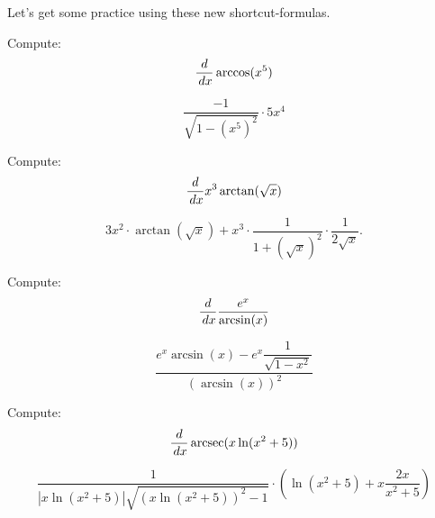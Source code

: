 \documentclass{ximera}
\begin{document}
Let's get some practice using these new shortcut-formulas.
\begin{example}
	Compute:
	\[ \frac{d}{\,d x} \arccos( x^5 ) \]
	
	\begin{explanation}
		\[ \dfrac{-1}{\sqrt{1-(x^5)^2}} \cdot 5x^4\]
	\end{explanation}

\end{example}

\begin{example}
	Compute:
	\[ \frac{d}{\,d x} x^3 \arctan(\sqrt{x}) \]
	
	\begin{explanation}
		\[ 3x^2 \cdot \arctan(\sqrt{x}) + x^3 \cdot \dfrac{1}{1 + (\sqrt{x})^2} \cdot \dfrac{1}{2\sqrt{x}}. \]
	\end{explanation}
\end{example}


\begin{example}
	Compute:
	\[ \frac{d}{\,d x} \dfrac{e^x}{\arcsin( x )} \]
	
	\begin{explanation}
		\[ \dfrac{e^x \arcsin(x) - e^x \dfrac{1}{\sqrt{1-x^2}}}{\left( \arcsin(x)\right)^2}\]
	\end{explanation}

\end{example}

\begin{example}
	Compute:
	\[ \frac{d}{\,d x} \operatorname{arcsec}(x \ln(x^2+5) ) \]
	
	\begin{explanation}
		\[ \dfrac{1}{|x\ln(x^2+5)|\sqrt{\left(x \ln(x^2+5)\right)^2-1}}\cdot \left(  \ln(x^2+5) + x \dfrac{2x}{x^2+5}\right) \]
	\end{explanation}

\end{example}
\end{document}
